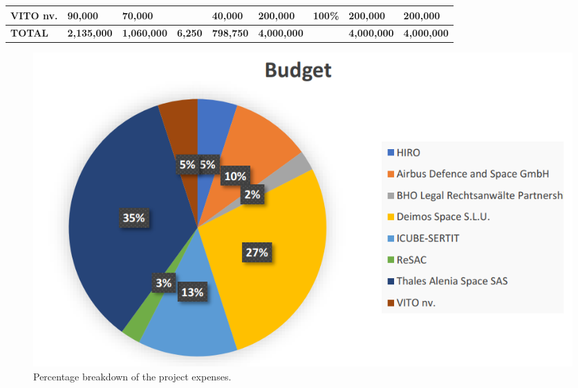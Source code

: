 \begin{table}[H]
{\begin{tabular}{p{5cm}p{2cm}p{2cm}p{2.5cm}p{2cm}p{2cm}p{2cm}p{2cm}p{2cm}}
\textbf{VITO nv.}                                                                        & 90,000                                                                                                & 70,000                                                                                          &                                                                                                                & 40,000                                                                                     & 200,000                                                                                                    & 100\%                                                                                                & 200,000                                                                                             & 200,000                                                                                               \\\hline
\textbf{TOTAL}                                                                           & \textbf{2,135,000}                                                                                    & \textbf{1,060,000}                                                                              & \textbf{6,250}                                                                                                 & \textbf{798,750}                                                                           & \textbf{4,000,000}                                                                                         & \textbf{}                                                                                            & \textbf{4,000,000}                                                                                  & \textbf{4,000,000}                                                                                   
\\ \bottomrule[2pt]
\end{tabular}}
\end{table}


\begin{figure}[H]
\centering
\includegraphics[scale=0.5]{./images/budget/budgetPie}
\caption{Percentage breakdown of the project expenses.}
\label{rules}
\end{figure}

